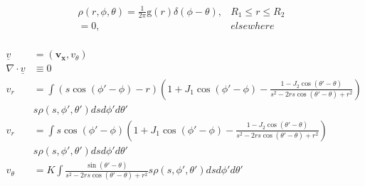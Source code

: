 \documentclass[10pt,aspectratio=43,mathserif,table]{beamer}
\begin{document}
\begin{frame}
    $$
    \begin{matrix}
        \rho \left( r,\phi ,\theta \right) =\frac{1}{2\pi}\mathrm{g}\left( r \right) \delta \left( \phi -\theta \right) ,&		R_1\le r\le R_2\\
        =0,&		elsewhere\\
    \end{matrix}
    $$

    {\small 
    $$
    \begin{aligned}
        \underline{v}&=\left( \mathbf{v}_{\mathbf{x}},v_{\theta} \right)\\
        \nabla \cdot \underline{v}&\equiv 0\\
        v_r&=\int{\left( s\cos \left( \phi \prime-\phi \right) -r \right) \left( 1+J_1\cos \left( \phi \prime-\phi \right) -\frac{1-J_2\cos \left( \theta \prime-\theta \right)}{s^2-2rs\cos \left( \theta \prime-\theta \right) +r^2} \right)}\\
        &s\rho \left( s,\phi \prime,\theta \prime \right) dsd\phi \prime d\theta \prime\\
        v_r&=\int{s\cos \left( \phi \prime-\phi \right) \left( 1+J_1\cos \left( \phi \prime-\phi \right) -\frac{1-J_2\cos \left( \theta \prime-\theta \right)}{s^2-2rs\cos \left( \theta \prime-\theta \right) +r^2} \right)}\\
        &s\rho \left( s,\phi \prime,\theta \prime \right) dsd\phi \prime d\theta \prime\\
        v_{\theta}&=K\int{\frac{\sin \left( \theta \prime-\theta \right)}{s^2-2rs\cos \left( \theta \prime-\theta \right) +r^2}s\rho \left( s,\phi \prime,\theta \prime \right) dsd\phi \prime d\theta \prime}\\
    \end{aligned}
    $$
    }

\end{frame}

\begin{frame}
    
\end{frame}
\end{document}
